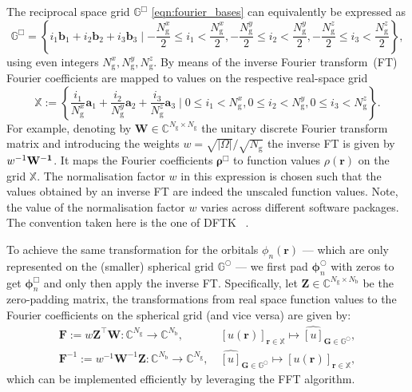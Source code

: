 \documentclass[hidelinks,onefignum,onetabnum]{siamart250211}
\newcommand{\C}{\mathbb{C}}
\newcommand{\G}{\mathbb{G}}
\newcommand{\X}{\mathbb{X}}
\newcommand{\Nb}{N_{\mathrm{b}}}
\newcommand{\Ng}{N_{\mathrm{g}}}
\begin{document}
%
The reciprocal space grid $\G^{\Box}$ \eqref{eqn:fourier_bases}
can equivalently be expressed as
\begin{equation}
    \G^{\Box} = \left\{ i_1 \bm b_1 + i_2 \bm b_2 + i_3 \bm b_3 \mid -\frac{\Ng^x}{2} \leq i_1 < \frac{\Ng^x}{2}, -\frac{\Ng^y}{2} \leq i_2 < \frac{\Ng^y}{2}, -\frac{\Ng^z}{2} \leq i_3 < \frac{\Ng^z}{2} \right\},
\end{equation}
using even integers $\Ng^x, \Ng^y, \Ng^z$.
By means of the inverse Fourier transform~(FT) Fourier coefficients are mapped
to values on the respective real-space grid
\begin{equation}
    \X := \left\{ \dfrac{i_1}{\Ng^x} \bm a_1 + \dfrac{i_2}{\Ng^y} \bm a_2 + \dfrac{i_3}{\Ng^z} \bm a_3 \mid 0 \leq i_1 < \Ng^x, 0 \leq i_2 < \Ng^y, 0 \leq i_3 < \Ng^z \right\}.
\end{equation}
For example, denoting by $\bm W \in \C^{\Ng \times \Ng}$ the unitary discrete
Fourier transform matrix and introducing the weights
$w =  \sqrt{|\Omega|}/\sqrt{\Ng}$ the inverse FT is given by $w^{-1} \bf W^{-1}$.
It maps the Fourier coefficients $\bm \rho^{\Box}$
to function values $\rho(\bm r)$ on the grid $\X$.
The normalisation factor $w$ in this expression is chosen
such that the values obtained by an inverse FT are indeed
the unscaled function values.
%
%
%
%
Note, the value of the normalisation factor $w$ varies across different
software packages. The convention taken here is the one of DFTK%
~\cite{herbst2021dftk}.

To achieve the same transformation for the orbitals $\phi_n(\bm r)$
--- which are only represented on the (smaller) spherical grid $\G^{\bigcirc}$ ---
we first pad $\bm \phi_n^{\bigcirc}$ with zeros to get $\bm \phi_n^{\Box}$
and only then apply the inverse FT.
Specifically, let $\bm Z \in \C^{\Ng \times \Nb}$ be the zero-padding matrix,
the transformations from real space function values to the Fourier
coefficients on the spherical grid
(and vice versa) are given by: %
\begin{equation}\label{eq:fft_ifft}
  \begin{aligned}
    \bm F := w \bm Z^{\top} \bm W: \C^{\Ng} \to \C^{\Nb},               & \ [u(\bm r)]_{\bm r \in \X} \mapsto \widehat{[u]}_{\bm G \in \G^{\bigcirc}},  \\
    \bm F^{-1} := w^{-1} \bm W^{-1} \bm Z: \C^{\Nb} \to \C^{\Ng}, & \ \widehat{[u]}_{\bm G \in \G^{\bigcirc}} \mapsto [u(\bm r)]_{\bm r \in \X},
  \end{aligned}
\end{equation}
which can be implemented efficiently by leveraging the FFT algorithm.
\end{document}
